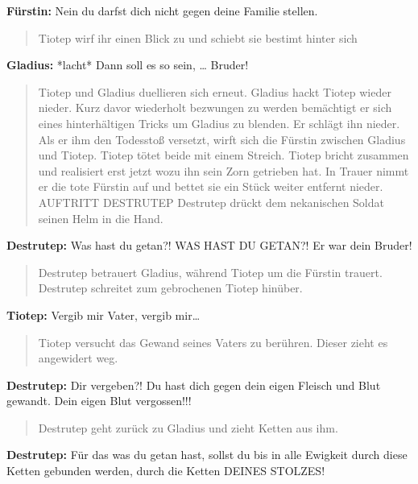 \documentclass[a5paper,6pt]{book}
\begin{document}
\textbf{Fürstin:} Nein du darfst dich nicht gegen deine Familie stellen.

\begin{quote}
Tiotep wirf ihr einen Blick zu und schiebt sie bestimt hinter sich                                                                 
 \end{quote} 

\textbf{Gladius:} *lacht* Dann soll es so sein, … Bruder!

\begin{quote}
Tiotep und Gladius duellieren sich erneut. Gladius hackt Tiotep wieder nieder. Kurz davor
wiederholt bezwungen zu werden bemächtigt er sich eines hinterhältigen Tricks um Gladius
zu blenden. Er schlägt ihn nieder. Als er ihm den Todesstoß versetzt, wirft sich die Fürstin
zwischen Gladius und Tiotep. Tiotep tötet beide mit einem Streich.
Tiotep bricht zusammen und realisiert erst jetzt wozu ihn sein Zorn getrieben hat. In Trauer
nimmt er die tote Fürstin auf und bettet sie ein Stück weiter entfernt nieder.
AUFTRITT DESTRUTEP
Destrutep drückt dem nekanischen Soldat seinen Helm in die Hand.                                                                
 \end{quote} 

\textbf{Destrutep:} Was hast du getan?! WAS HAST DU GETAN?! Er war dein Bruder!

\begin{quote}
Destrutep betrauert Gladius, während Tiotep um die Fürstin trauert. Destrutep schreitet zum
gebrochenen Tiotep hinüber.                                                              
 \end{quote} 


\textbf{Tiotep:} Vergib mir Vater, vergib mir…

\begin{quote}
Tiotep versucht das Gewand seines Vaters zu berühren. Dieser zieht es angewidert weg.                                                           
 \end{quote} 


\textbf{Destrutep:} Dir vergeben?! Du hast dich gegen dein eigen Fleisch und Blut gewandt. Dein
eigen Blut vergossen!!!

\begin{quote}
Destrutep geht zurück zu Gladius und zieht Ketten aus ihm.                                                        
 \end{quote} 


\textbf{Destrutep:} Für das was du getan hast, sollst du bis in alle Ewigkeit durch diese Ketten
gebunden werden, durch die Ketten DEINES STOLZES!
\end{document}
